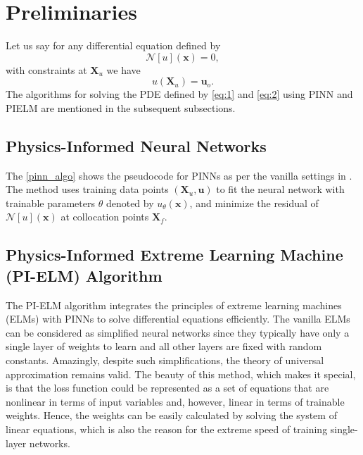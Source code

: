 \documentclass{article}
\begin{document}
\section{Preliminaries}
Let us say for any differential equation defined by \begin{equation}
\label{eq:1}
\mathcal{N}[u](\mathbf{x}) = 0,
\end{equation}
with constraints at $\mathbf{X}_u$ we have 
\begin{equation}
\label{eq:2}
u(\mathbf{X}_u) = \mathbf{u}_o.
\end{equation} 
The algorithms for solving the PDE defined by \cref{eq:1} and \cref{eq:2} using PINN and PIELM are mentioned in the subsequent subsections.

\subsection{Physics-Informed Neural Networks}
The \cref{pinn_algo} shows the pseudocode for PINNs as per the vanilla settings in \cite{RAISSI2019686}. The method uses training data points $(\mathbf{X}_u, \mathbf{u})$ to fit the neural network with trainable parameters $\theta$ denoted by $u_\theta(\mathbf{x})$, and minimize the residual of $\mathcal{N}[u](\mathbf{x})$ at collocation points $\mathbf{X}_f$.


\subsection{Physics-Informed Extreme Learning Machine (PI-ELM) Algorithm}

The PI-ELM algorithm integrates the principles of extreme learning machines (ELMs) with PINNs to solve differential equations efficiently. The vanilla ELMs can be considered as simplified neural networks since they typically have only a single layer of weights to learn and all other layers are fixed with random constants\cite{huang2006extreme}. Amazingly, despite such simplifications, the theory of universal approximation remains valid\cite{Huang2006UniversalAU, HUANG20073056}. The beauty of this method, which makes it special, is that the loss function could be represented as a set of equations that are nonlinear in terms of input variables and, however, linear in terms of trainable weights. Hence, the weights can be easily calculated by solving the system of linear equations, which is also the reason for the extreme speed of training single-layer networks.  
\end{document}
